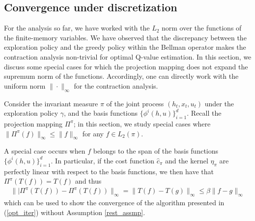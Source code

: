 \documentclass[letterpaper, 10 pt, conference]{ieeeconf}  %
\theoremstyle{definition}
\theoremstyle{remark}
\begin{document}
\subsection{Convergence under discretization}
For the analysis so far, we have worked with the $L_2$ norm over the functions of the finite-memory variables.  We have observed that the discrepancy between the exploration policy and the greedy policy within the Bellman operator makes the contraction analysis non-trivial for optimal Q-value estimation. In this section, we discuss some special cases for which the projection mapping does not expand the supremum norm of the functions. Accordingly, one can directly work with the uniform norm $\|\cdot\|_\infty$ for the contraction analysis.

Consider the invariant measure $\pi$ of the joint process $(h_t,x_t,u_t)$ under the exploration policy $\gamma$, and the basis functions $\{\phi^i(h,u)\}_{i=1}^d$. Recall the projection mapping $\Pi^\pi$; in this section, we study special cases where $\|\Pi^\pi(f)\|_\infty \leq \|f\|_\infty$ for any $f\in L_2(\pi)$. 

A special case occurs when $f$ belongs to the span of the basis functions $\{\phi^i(h,u)\}_{i=1}^d$. 
In particular, if the cost function $\hat{c}_\pi$ and the kernel $\eta_\pi$ are perfectly linear with respect to the basis functions, we then have that $\Pi^\pi(T(f)) = T(f)$ and thus
\begin{align*}
\||\Pi^\pi(T(f))-\Pi^\pi(T(f))\|_\infty = \|T(f)-T(g)\|_\infty\leq \beta\|f-g\|_\infty
\end{align*}
which can be used to show the convergence of the algorithm presented in (\ref{opt_iter}) without Assumption \ref{rest_assmp}. 
\end{document}
